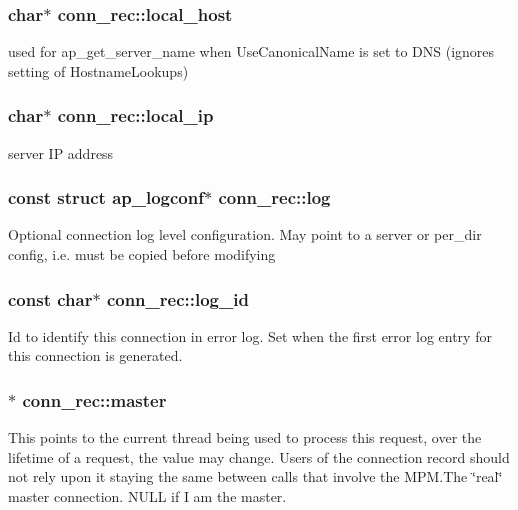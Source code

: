 \subsubsection[{\texorpdfstring{local\+\_\+host}{local_host}}]{\setlength{\rightskip}{0pt plus 5cm}char$\ast$ conn\+\_\+rec\+::local\+\_\+host}\hypertarget{structconn__rec_a9103b4e4f0f045c34e7f1486812defd5}{}\label{structconn__rec_a9103b4e4f0f045c34e7f1486812defd5}
used for ap\+\_\+get\+\_\+server\+\_\+name when Use\+Canonical\+Name is set to D\+NS (ignores setting of Hostname\+Lookups) 
\subsubsection[{\texorpdfstring{local\+\_\+ip}{local_ip}}]{\setlength{\rightskip}{0pt plus 5cm}char$\ast$ conn\+\_\+rec\+::local\+\_\+ip}\hypertarget{structconn__rec_add15ebc9e65901c998b2daeb8c59485c}{}\label{structconn__rec_add15ebc9e65901c998b2daeb8c59485c}
server IP address 
\subsubsection[{\texorpdfstring{log}{log}}]{\setlength{\rightskip}{0pt plus 5cm}const struct {\bf ap\+\_\+logconf}$\ast$ conn\+\_\+rec\+::log}\hypertarget{structconn__rec_a0c921a26d4cef13e36814064603e4613}{}\label{structconn__rec_a0c921a26d4cef13e36814064603e4613}
Optional connection log level configuration. May point to a server or per\+\_\+dir config, i.\+e. must be copied before modifying 
\subsubsection[{\texorpdfstring{log\+\_\+id}{log_id}}]{\setlength{\rightskip}{0pt plus 5cm}const char$\ast$ conn\+\_\+rec\+::log\+\_\+id}\hypertarget{structconn__rec_a8f009e9adfaeecd2b9faaf91b017cfae}{}\label{structconn__rec_a8f009e9adfaeecd2b9faaf91b017cfae}
Id to identify this connection in error log. Set when the first error log entry for this connection is generated. 
\subsubsection[{\texorpdfstring{master}{master}}]{$\ast$ conn\+\_\+rec\+::master}\hypertarget{structconn__rec_acc75f0de138c66d0dc80a59ea4a61094}{}\label{structconn__rec_acc75f0de138c66d0dc80a59ea4a61094}
This points to the current thread being used to process this request, over the lifetime of a request, the value may change. Users of the connection record should not rely upon it staying the same between calls that involve the M\+P\+M.\+The \char`\"{}real\char`\"{} master connection. N\+U\+LL if I am the master. 
